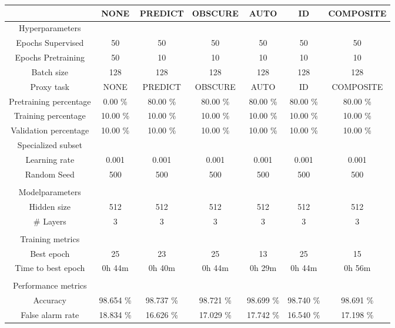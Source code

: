 \begin{table}[htb]
    \centering
    \begin{tabular}{@{}ccccccc@{}}
        \toprule
         &  NONE &  PREDICT &  OBSCURE &  AUTO &  ID &  COMPOSITE \\
        \midrule
        Hyperparameters &  &  &  &  &  &  \\
        Epochs Supervised &  50 &  50 &  50 &  50 &  50 &  50 \\
        Epochs Pretraining &  50 &  10 &  10 &  10 &  10 &  10 \\
        Batch size &  128 &  128 &  128 &  128 &  128 &  128 \\
        Proxy task &  NONE &  PREDICT &  OBSCURE &  AUTO &  ID &  COMPOSITE \\
        Pretraining percentage &  0.00 \% &  80.00 \% &  80.00 \% &  80.00 \% &  80.00 \% &  80.00 \% \\
        Training percentage &  10.00 \% &  10.00 \% &  10.00 \% &  10.00 \% &  10.00 \% &  10.00 \% \\
        Validation percentage &  10.00 \% &  10.00 \% &  10.00 \% &  10.00 \% &  10.00 \% &  10.00 \% \\
        Specialized subset &   &   &   &   &   &   \\
        Learning rate &  0.001 &  0.001 &  0.001 &  0.001 &  0.001 &  0.001 \\
        Random Seed &  500 &  500 &  500 &  500 &  500 &  500 \\
         \\
        Modelparameters &  &  &  &  &  &  \\
        Hidden size &  512 &  512 &  512 &  512 &  512 &  512 \\
        \# Layers &  3 &  3 &  3 &  3 &  3 &  3 \\
         \\
        Training metrics &  &  &  &  &  &  \\
        Best epoch &  25 &  23 &  25 &  13 &  25 &  15 \\
        Time to best epoch &  0h 44m &  0h 40m &  0h 44m &  0h 29m &  0h 44m &  0h 56m \\
         \\
        Performance metrics &  &  &  &  &  &  \\
        Accuracy &  98.654 \% &  98.737 \% &  98.721 \% &  98.699 \% &  98.740 \% &  98.691 \% \\
        False alarm rate &  18.834 \% &  16.626 \% &  17.029 \% &  17.742 \% &  16.540 \% &  17.198 \% \\

\end{tabular}
\end{table}
